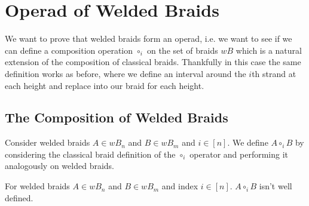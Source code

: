 
\chapter{Operad of Welded Braids} 

We want to prove that welded braids form an operad, i.e. we want to see if we can define a composition operation \( \circ_i \) on the set of braids \( wB \) which is a natural extension of the composition of classical braids.
Thankfully in this case the same definition works as before, where we define an interval around the \( i \)th strand at each height and replace into our braid for each height. 

\section{The Composition of Welded Braids} \label{sec:wb_composition}

Consider welded braids \( A \in wB_n \) and \( B \in wB_m \) and \( i \in [n] \).
We define \( A \circ_i B \) by considering the classical braid definition of the \( \circ_i \) operator and performing it analogously on welded braids. 

\begin{Theorem}
    For welded braids \( A \in wB_n \) and \( B \in wB_m\) and index \( i \in [n] \). 
    \( A \circ_i B \) isn't well defined.
\end{Theorem}

